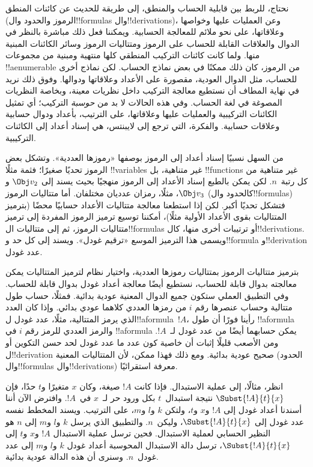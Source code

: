 \documentclass[../../../include/open-logic-section]{subfiles}
\begin{document}

نحتاج، للربط بين قابلية الحساب والمنطق، إلى طريقة للحديث عن كائنات
المنطق (الرموز والحدود وال!!{formula}s وال!!{derivation}s)، وعن
العمليات عليها وخواصها وعلاقاتها، على نحو ملائم للمعالجة الحسابية.
ويمكننا فعل ذلك مباشرة بالنظر في الدوال والعلاقات القابلة للحساب على
الرموز ومتتاليات الرموز وسائر الكائنات المبنية منها. ولما كانت كائنات
التركيب المنطقي كلها منتهية ومبنية من مجموعات !!a{enumerable} من
الرموز، كان ذلك ممكنًا في بعض نماذج الحساب. لكن نماذج أخرى للحساب،
مثل الدوال العودية، مقصورة على الأعداد وعلاقاتها ودوالها. وفوق ذلك
نريد في نهاية المطاف أن نستطيع معالجة التركيب داخل نظريات معينة،
وبخاصة النظريات المصوغة في لغة الحساب. وفي هذه الحالات لا بد من
\emph{حوسبة} التركيب؛ أي تمثيل الكائنات التركيبية والعمليات عليها
وعلاقاتها، على الترتيب، بأعداد ودوال حسابية وعلاقات حسابية. والفكرة،
التي ترجع إلى لايبنتس، هي إسناد أعداد إلى الكائنات التركيبية.

من السهل نسبيًا إسناد أعداد إلى الرموز بوصفها «رموزها العددية». وتشكل
بعض الرموز تحديًا صغيرًا؛ فثمة مثلًا !!{variable}s غير متناهية، بل
!!{function}s غير متناهية من كل رتبة~$n$. لكن يمكن بالطبع إسناد
الأعداد إلى الرموز منهجيًا بحيث يسند إلى $\Obj v_2$ و$\Obj v_3$،
مثلًا، رمزان عدديان مختلفان. أما متتاليات الرموز (كالحدود
وال!!{formula}s) فتشكل تحديًا أكبر. لكن إذا استطعنا معالجة متتاليات
الأعداد حسابيًا محضًا (بترميز المتتاليات بقوى الأعداد الأولية مثلًا)،
أمكننا توسيع ترميز الرموز المفردة إلى ترميز متتاليات الرموز، ثم إلى
متتاليات ال!!{formula}s أو ترتيبات أخرى منها، كال!!{derivation}s.
ويسمى هذا الترميز الموسع «ترقيم غودل». ويسند إلى كل حد و!!{formula}
و!!{derivation} عدد غودل.

بترميز متتاليات الرموز بمتتاليات رموزها العددية، واختيار نظام لترميز
المتتاليات يمكن معالجته بدوال قابلة للحساب، نستطيع أيضًا معالجة أعداد
غودل بدوال قابلة للحساب. وفي التطبيق العملي ستكون جميع الدوال المعنية
عودية بدائية. فمثلًا، حساب طول متتالية وحساب عنصرها رقم $i$ من رمزها
العددي كلاهما عودي بدائي. وإذا كان العدد الذي يرمز المتتالية، مثلًا،
عدد غودل ل!!a{formula}~$!A$، رأينا فورًا أن طول !!a{formula} والرمز
العددي للرمز رقم $i$ في !!a{formula} يمكن حسابهما أيضًا من عدد غودل لـ~$!A$.
ومن الأصعب قليلًا إثبات أن خاصية كون عدد ما عدد غودل لحد حسن التكوين
أو ل!!{derivation} صحيح عودية بدائية. ومع ذلك فهذا ممكن، لأن
المتتاليات المعنية (الحدود وال!!{formula}s وال!!{derivation}s) معرفة
استقرائيًا.

انظر، مثالًا، إلى عملية الاستبدال. فإذا كانت $!A$ صيغة، وكان $x$
متغيرًا و$t$ حدًا، فإن $\Subst{!A}{t}{x}$ نتيجة استبدال~$t$ بكل ورود
حر لـ~$x$ في~$!A$. وافترض الآن أننا أسندنا أعداد غودل إلى $!A$ و$x$
و$t$، ولتكن $k$ و$l$ و$m$، على الترتيب. ويسند المخطط نفسه عدد غودل
إلى $\Subst{!A}{t}{x}$، وليكن~$n$. والتطبيق الذي يرسل $k$ و$l$ و$m$
إلى $n$ هو النظير الحسابي لعملية الاستبدال. فحين ترسل عملية الاستبدال
$!A$ و$x$ و$t$ إلى $\Subst{!A}{t}{x}$، ترسل دالة الاستبدال المحوسبة
أعداد غودل $k$ و$l$ و$m$ إلى عدد غودل~$n$. وسنرى أن هذه الدالة
عودية بدائية.
\end{document}
